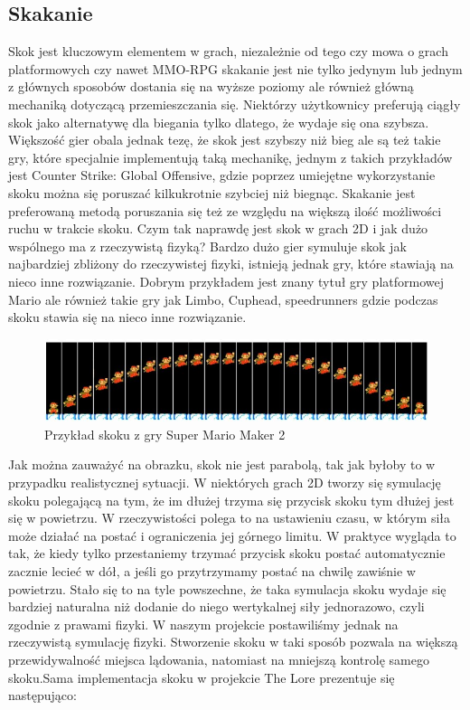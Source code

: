 \documentclass[oneside,polski,logo]{amuthesis}
\begin{document}
\subsection{Skakanie} 
Skok jest kluczowym elementem w grach, niezależnie od tego czy mowa o grach platformowych czy nawet MMO-RPG skakanie jest nie tylko jedynym lub jednym z głównych sposobów dostania się na wyższe poziomy ale również główną mechaniką dotyczącą przemieszczania się. Niektórzy użytkownicy preferują ciągły skok jako alternatywę dla biegania tylko dlatego, że wydaje się ona szybsza. Większość gier obala jednak tezę, że skok jest szybszy niż bieg ale są też takie gry, które specjalnie implementują taką mechanikę, jednym z takich przykładów jest Counter Strike: Global Offensive, gdzie poprzez umiejętne wykorzystanie skoku można się poruszać kilkukrotnie szybciej niż biegnąc. Skakanie jest preferowaną metodą poruszania się też ze względu na większą ilość możliwości ruchu w trakcie skoku.
Czym tak naprawdę jest skok w grach 2D i jak dużo wspólnego ma z rzeczywistą fizyką? Bardzo dużo gier symuluje skok jak najbardziej zbliżony do rzeczywistej fizyki, istnieją jednak gry, które stawiają na nieco inne rozwiązanie. Dobrym przykładem jest znany tytuł gry platformowej Mario ale również takie gry jak Limbo, Cuphead, speedrunners gdzie podczas skoku stawia się na nieco inne rozwiązanie. 
\newpage
\begin{figure}[h]
	\centering
	\includegraphics[width=13cm]{images/kozubal/mario.jpg}
	\caption{Przykład skoku z gry Super Mario Maker 2}
\end{figure}

Jak można zauważyć na obrazku, skok nie jest parabolą, tak jak byłoby to w przypadku realistycznej sytuacji. W niektórych grach 2D tworzy się symulację skoku polegającą na tym, że im dłużej trzyma się przycisk skoku tym dłużej jest się w powietrzu. W rzeczywistości polega to na ustawieniu czasu, w którym siła może działać na postać i ograniczenia jej górnego limitu. W praktyce wygląda to tak, że kiedy tylko przestaniemy trzymać przycisk skoku postać automatycznie zacznie lecieć w dół, a jeśli go przytrzymamy postać na chwilę zawiśnie w powietrzu. Stało się to na tyle powszechne, że taka symulacja skoku wydaje się bardziej naturalna niż dodanie do niego wertykalnej siły jednorazowo, czyli zgodnie z prawami fizyki.  W naszym projekcie postawiliśmy jednak na rzeczywistą symulację fizyki. Stworzenie skoku w taki sposób pozwala na większą przewidywalność miejsca lądowania, natomiast na mniejszą kontrolę samego skoku.Sama implementacja skoku w projekcie The Lore prezentuje się następująco:
\end{document}
